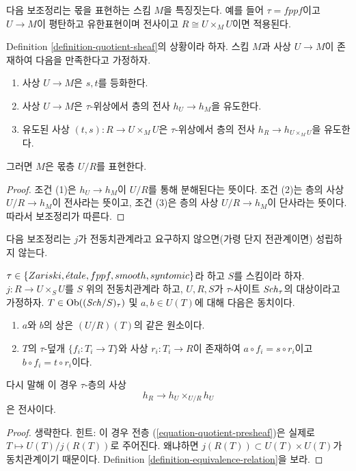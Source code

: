 \noindent
다음 보조정리는 몫을 표현하는 스킴 $M$을 특징짓는다. 예를 들어 $\tau = fppf$이고 $U \to M$이 평탄하고
유한표현이며 전사이고 $R \cong U \times_M U$이면 적용된다.

\begin{lemma}
\label{lemma-criterion-quotient-representable}
Definition \ref{definition-quotient-sheaf}의 상황이라 하자. 스킴 $M$과 사상 $U \to M$이 존재하여 다음을 만족한다고 가정하자.
\begin{enumerate}
\item 사상 $U \to M$은 $s, t$를 등화한다.
\item 사상 $U \to M$은 $\tau$-위상에서 층의 전사 $h_U \to h_M$을 유도한다.
\item 유도된 사상 $(t, s) : R \to U \times_M U$은 $\tau$-위상에서 층의 전사
$h_R \to h_{U \times_M U}$을 유도한다.
\end{enumerate}
그러면 $M$은 몫층 $U/R$를 표현한다.
\end{lemma}

\begin{proof}
조건 (1)은 $h_U \to h_M$이 $U/R$를 통해 분해된다는 뜻이다. 조건 (2)는 층의 사상
$U/R \to h_M$이 전사라는 뜻이고, 조건 (3)은 층의 사상 $U/R \to h_M$이 단사라는 뜻이다.
따라서 보조정리가 따른다.
\end{proof}

\noindent
다음 보조정리는 $j$가 전동치관계라고 요구하지 않으면(가령 단지 전관계이면) 성립하지 않는다.

\begin{lemma}
\label{lemma-quotient-pre-equivalence}
$\tau \in \{Zariski, {\acute{e}tale}, fppf, smooth, syntomic\}$라 하고 $S$를 스킴이라 하자.
$j : R \to U \times_S U$를 $S$ 위의 전동치관계라 하고, $U, R, S$가 $\tau$-사이트 $\mathit{Sch}_\tau$의 대상이라고 가정하자.
$T \in \mathop{\mathrm{Ob}}\nolimits((\mathit{Sch}/S)_\tau)$ 및 $a, b \in U(T)$에 대해 다음은 동치이다.
\begin{enumerate}
\item $a$와 $b$의 상은 $(U/R)(T)$의 같은 원소이다.
\item $T$의 $\tau$-덮개 $\{f_i : T_i \to T\}$와 사상 $r_i : T_i \to R$이 존재하여
$a \circ f_i = s \circ r_i$이고 $b \circ f_i = t \circ r_i$이다.
\end{enumerate}
다시 말해 이 경우 $\tau$-층의 사상
$$
h_R \longrightarrow h_U \times_{U/R} h_U
$$
은 전사이다.
\end{lemma}

\begin{proof}
생략한다. 힌트: 이 경우 전층 (\ref{equation-quotient-presheaf})은 실제로 $T \mapsto U(T)/j(R(T))$로 주어진다.
왜냐하면 $j(R(T)) \subset U(T) \times U(T)$가 동치관계이기 때문이다. Definition
\ref{definition-equivalence-relation}을 보라.
\end{proof}

